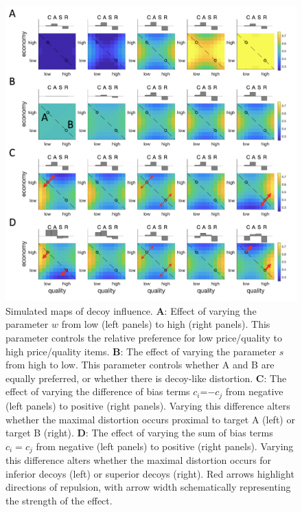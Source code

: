 \documentclass[a4paper, nobind]{templates/ociamthesis}
\begin{document}
\begin{figure}

{\centering \includegraphics[width=1\linewidth]{figures/decoy-sim} 

}

\caption[Map simulations]{Simulated maps of decoy influence. $\textbf{A:}$ Effect of varying the parameter $w$ from low (left panels) to high (right panels). This parameter controls the relative preference for low price/quality to high price/quality items. $\textbf{B:}$ The effect of varying the parameter $s$ from high to low. This parameter controls whether A and B are equally preferred, or whether there is decoy-like distortion. $\textbf{C:}$  The effect of varying the difference of bias terms $c_i$=$-c_j$ from negative (left panels) to positive (right panels). Varying this difference alters whether the maximal distortion occurs proximal to target A (left) or target B (right). $\textbf{D:}$ The effect of varying the sum of bias terms $c_i=c_j$ from negative (left panels) to positive (right panels). Varying this difference alters whether the maximal distortion occurs for inferior decoys (left) or superior decoys (right). Red arrows highlight directions of repulsion, with arrow width schematically representing the strength of the effect. }\label{fig:decoy-sim}
\end{figure}
\end{document}
